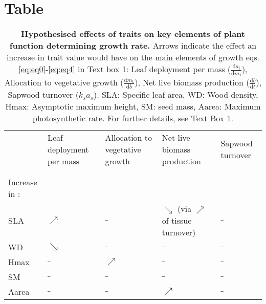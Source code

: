 \documentclass[a4paper]{article}\usepackage[]{graphicx}\usepackage[]{color}
\begin{document}
\section*{Table}
\setcounter{table}{0}
\begin{table}[h!]
\centering
\caption{\textbf{Hypothesised effects of traits on key elements of plant function determining growth rate.} Arrows indicate the effect an increase in trait value would have on the main elements of growth eqs. \ref{eq:eq0}-\ref{eq:eq4} in Text box 1:  Leaf deployment per mass ($\frac{\textrm{d}a_\textrm{l}}{\textrm{d}m_\textrm{t}}$), Allocation to vegetative growth ($\frac{\textrm{d}m_\textrm{t}}{\textrm{d}b}$), Net live biomass production ($\frac{\textrm{d}b}{\textrm{d}t}$), Sapwood turnover ($k_s a_s$). SLA: Specific leaf area, WD: Wood density, Hmax: Asymptotic maximum height, SM: seed mass, Aarea: Maximum photosynthetic rate. For further details, see Text Box 1.}
\vspace{1cm}
  \begin{tabular}{l p{3cm} p{2cm}p{4cm} p{2cm}}
  & Leaf deployment \newline per mass
  & Allocation to vegetative growth
  & Net live biomass \newline production
  & Sapwood turnover\\
  & & & &\\\hline
  & & & & \\
Increase in : & & & & \\ 
  SLA &$\nearrow$ &$\_$ & $\searrow$ \newline (via $\nearrow$ of tissue turnover) &$\_$ \\
  WD & $\searrow$ &$\_$  &$\_$ &$\_$ \\
  Hmax &$\_$ &$\nearrow$ &$\_$ &$\_$ \\
  SM &$\_$&$\_$&$\_$& $\_$\\ 
  Aarea &$\_$ &$\_$ & $\nearrow$ &$\_$ \\
\hline
  \end{tabular}
  \end{table}
\label{tab:trade-offs}
\end{document}
